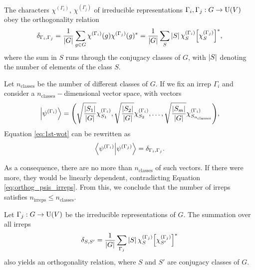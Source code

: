 \begin{theorem} \label{th:1st-wot}
The characters $\chi^{(\Gamma_i)}$, $\chi^{(\Gamma_j)}$ of irreducible representations $\Gamma_i, \Gamma_j: G \to {\text{U}}(V)$ obey the orthogonality relation
\begin{equation} \label{eq:1st-wot}
\delta_{\Gamma_i, \Gamma_j} =
\frac{1}{\abs{G}} \sum_{g \in G} \chi^{(\Gamma_i)}(g) \chi^{(\Gamma_j)}(g)^* =
\frac{1}{\abs{G}} \sum_{S} \abs{S} \, \chi^{(\Gamma_i)}_S \qty[\chi^{(\Gamma_j)}_S]^*,
\end{equation}
where the sum in $S$ runs through the conjugacy classes of $G$, with $\abs{S}$ denoting the number of elements of the class $S$.
\end{theorem}

Let $n_{\text{classes}}$ be the number of different classes of $G$. If we fix an irrep $\Gamma_i$ and consider a $n_{\text{classes}} -$dimensional vector space, with vectors
\begin{equation} \label{eq:nclasses_space}
\ket{\psi^{(\Gamma_i)}} =
\qty(
\sqrt{\frac{\abs{S_1}}{\abs{G}}} \chi^{(\Gamma_i)}_{S_1},
\sqrt{\frac{\abs{S_2}}{\abs{G}}} \chi^{(\Gamma_i)}_{S_2},
\ldots,
\sqrt{\frac{\abs{S_m}}{\abs{G}}} \chi^{(\Gamma_i)}_{S_{n_{\text{classes}}}}
),
\end{equation}
Equation \ref{eq:1st-wot} can be rewritten as
\begin{equation} \label{eq:orthog_psis_irreps}
\braket{\psi^{(\Gamma_i)}}{\psi^{(\Gamma_j)}} = \delta_{\Gamma_i, \Gamma_j}.
\end{equation}

As a consequence, there are no more than $n_{\text{classes}}$ of such vectors. If there were more, they would be linearly dependent, contradicting Equation \ref{eq:orthog_psis_irreps}. From this, we conclude that the number of irreps satisfies $n_{\text{irreps}} \leq n_{\text{classes}}$.

\begin{theorem} \label{th:2nd-wot}
Let $\Gamma_j: G \to {\text{U}}(V)$ be the irreducible representations of $G$. The summation over all irreps
\begin{equation} \label{eq:2nd-wot}
\delta_{S, S'} = \frac{1}{\abs{G}} \sum_{\Gamma_j} \abs{S} \, \chi^{(\Gamma_j)}_S \qty[\chi^{(\Gamma_j)}_{S'}]^*
\end{equation}
also yields an orthogonality relation, where $S$ and $S'$ are conjugacy classes of $G$.
\end{theorem}

